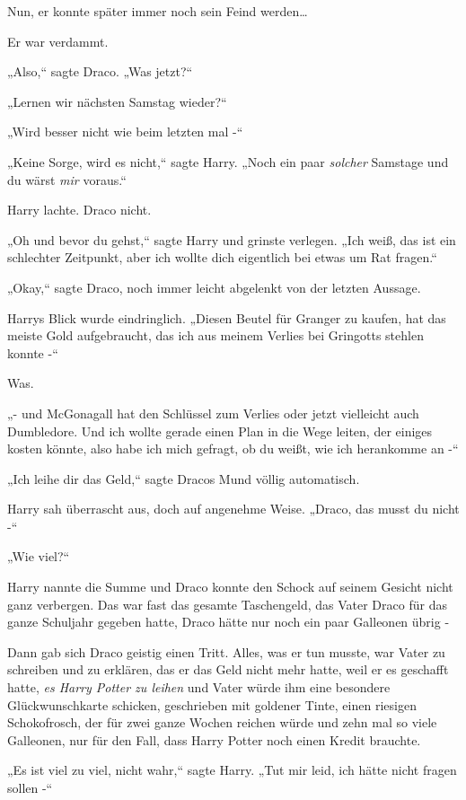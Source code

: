 {Nun, er konnte später immer noch sein Feind werden…

Er war verdammt.

„Also,“ sagte Draco. „Was jetzt?“

„Lernen wir nächsten Samstag wieder?“

„Wird besser nicht wie beim letzten mal -“

„Keine Sorge, wird es nicht,“ sagte Harry. „Noch ein paar \emph{solcher} Samstage und du wärst \emph{mir} voraus.“

Harry lachte. Draco nicht.

„Oh und bevor du gehst,“ sagte Harry und grinste verlegen. „Ich weiß, das ist ein schlechter Zeitpunkt, aber ich wollte dich eigentlich bei etwas um Rat fragen.“

„Okay,“ sagte Draco, noch immer leicht abgelenkt von der letzten Aussage.

Harrys Blick wurde eindringlich. „Diesen Beutel für Granger zu kaufen, hat das meiste Gold aufgebraucht, das ich aus meinem Verlies bei Gringotts stehlen konnte -“

Was.

„- und McGonagall hat den Schlüssel zum Verlies oder jetzt vielleicht auch Dumbledore. Und ich wollte gerade einen Plan in die Wege leiten, der einiges kosten könnte, also habe ich mich gefragt, ob du weißt, wie ich herankomme an -“

„Ich leihe dir das Geld,“ sagte Dracos Mund völlig automatisch.

Harry sah überrascht aus, doch auf angenehme Weise. „Draco, das musst du nicht -“

„Wie viel?“

Harry nannte die Summe und Draco konnte den Schock auf seinem Gesicht nicht ganz verbergen. Das war fast das gesamte Taschengeld, das Vater Draco für das ganze Schuljahr gegeben hatte, Draco hätte nur noch ein paar Galleonen übrig -

Dann gab sich Draco geistig einen Tritt. Alles, was er tun musste, war Vater zu schreiben und zu erklären, das er das Geld nicht mehr hatte, weil er es geschafft hatte, \emph{es Harry Potter zu leihen} und Vater würde ihm eine besondere Glückwunschkarte schicken, geschrieben mit goldener Tinte, einen riesigen Schokofrosch, der für zwei ganze Wochen reichen würde und zehn mal so viele Galleonen, nur für den Fall, dass Harry Potter noch einen Kredit brauchte.

„Es ist viel zu viel, nicht wahr,“ sagte Harry. „Tut mir leid, ich hätte nicht fragen sollen -“

}
